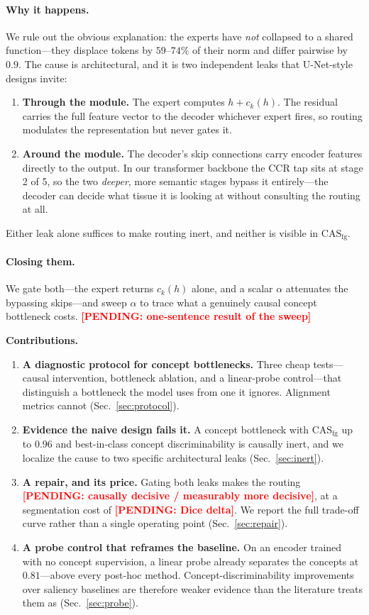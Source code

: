 \documentclass[runningheads]{llncs}
\newcommand{\casfg}{\mathrm{CAS}_{\mathrm{fg}}}
\newcounter{pend}
\newcommand{\pending}[1]{\stepcounter{pend}\textcolor{red}{\textbf{[PENDING: #1]}}}
\begin{document}
\paragraph{Why it happens.}
We rule out the obvious explanation: the experts have \emph{not} collapsed to a shared
function---they displace tokens by $59$--$74\%$ of their norm and differ pairwise by $0.9$.
The cause is architectural, and it is two independent leaks that U-Net-style designs invite:

\begin{enumerate}
\item \textbf{Through the module.} The expert computes $h + c_k(h)$. The residual carries the
full feature vector to the decoder whichever expert fires, so routing modulates the
representation but never gates it.
\item \textbf{Around the module.} The decoder's skip connections carry encoder features
directly to the output. In our transformer backbone the CCR tap sits at stage 2 of 5, so the
two \emph{deeper}, more semantic stages bypass it entirely---the decoder can decide what tissue
it is looking at without consulting the routing at all.
\end{enumerate}

Either leak alone suffices to make routing inert, and neither is visible in $\casfg$.

\paragraph{Closing them.}
We gate both---the expert returns $c_k(h)$ alone, and a scalar $\alpha$ attenuates the
bypassing skips---and sweep $\alpha$ to trace what a genuinely causal concept bottleneck costs.
\pending{one-sentence result of the sweep}

\noindent\textbf{Contributions.}
\begin{enumerate}
\item \textbf{A diagnostic protocol for concept bottlenecks.} Three cheap tests---causal
intervention, bottleneck ablation, and a linear-probe control---that distinguish a bottleneck
the model uses from one it ignores. Alignment metrics cannot (Sec.~\ref{sec:protocol}).
\item \textbf{Evidence the naive design fails it.} A concept bottleneck with $\casfg$ up to
$0.96$ and best-in-class concept discriminability is causally inert, and we localize the cause
to two specific architectural leaks (Sec.~\ref{sec:inert}).
\item \textbf{A repair, and its price.} Gating both leaks makes the routing
\pending{causally decisive / measurably more decisive}, at a segmentation cost of
\pending{Dice delta}. We report the full trade-off curve rather than a single operating point
(Sec.~\ref{sec:repair}).
\item \textbf{A probe control that reframes the baseline.} On an encoder trained with no
concept supervision, a linear probe already separates the concepts at $0.81$---above every
post-hoc method. Concept-discriminability improvements over saliency baselines are therefore
weaker evidence than the literature treats them as (Sec.~\ref{sec:probe}).
\end{enumerate}
\end{document}
